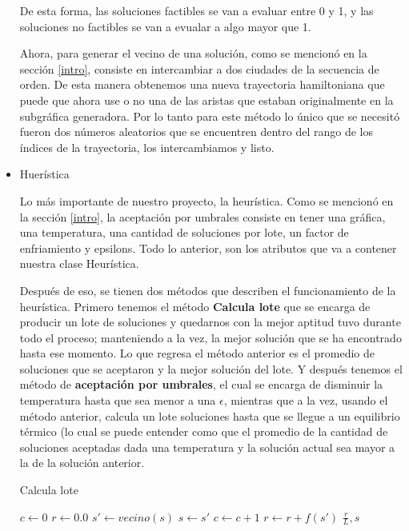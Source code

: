 \documentclass{article}
\newcommand{\tbf}[1]{\textbf{#1}}
\begin{document}
\begin{itemize}
      De esta forma, las soluciones factibles se van a evaluar entre 
      0 y 1, y las soluciones no factibles se van a evualar a algo 
      mayor que 1.

      Ahora, para generar el vecino de una solución, como 
      se mencionó en la sección \ref{intro}, consiste en intercambiar
      a dos ciudades de la secuencia de orden. De esta manera obtenemos
      una nueva trayectoria hamiltoniana que puede que ahora use o no 
      una de las aristas que estaban originalmente en la subgráfica 
      generadora. Por lo tanto para este método lo único que 
      se necesitó fueron dos números aleatorios que se encuentren 
      dentro del rango de los índices de la trayectoria, los 
      intercambiamos y listo.

    \item Huerística

      Lo más importante de nuestro proyecto, la heurística. Como se 
      mencionó en la sección \ref{intro}, la aceptación por umbrales consiste 
      en tener una gráfica, una temperatura, una cantidad de soluciones 
      por lote, un factor de enfriamiento y epsilons. Todo lo anterior,
      son los atributos que va a contener nuestra clase Heurística.
      
      Después de eso, se tienen dos métodos que describen el 
      funcionamiento de la heurística. Primero tenemos el método
      \tbf{Calcula lote} que se encarga de producir un lote de soluciones
      y quedarnos con la mejor aptitud tuvo durante todo el proceso;
      manteniendo a la vez, la mejor solución que se ha encontrado hasta 
      ese momento. Lo que regresa el método anterior es el promedio de 
      soluciones que se aceptaron y la mejor solución del lote. Y después
      tenemos el método de \tbf{aceptación por umbrales}, el cual se encarga
      de disminuir la temperatura hasta que sea menor a una $\epsilon$,
      mientras que a la vez, usando el método anterior, calcula un lote 
      soluciones hasta que se llegue a un equilibrio térmico (lo cual se 
      puede entender como que el promedio de la cantidad de soluciones 
      aceptadas dada una temperatura y la solución actual sea mayor a la 
      de la solución anterior.

      \begin{algorithm}[H]
        \caption{Calcula lote}
        \SetAlgoLined
        $c \leftarrow 0$\;
        $r \leftarrow 0.0$\;
         {
          $s' \leftarrow vecino(s)$\;
           {
            $s \leftarrow s'$\;
            $c \leftarrow c + 1$\;
            $r \leftarrow r + f(s')$\;
          }
        }
        \Return $\frac{r}{L}, s$\;
      \end{algorithm}


\end{itemize}
\end{document}
